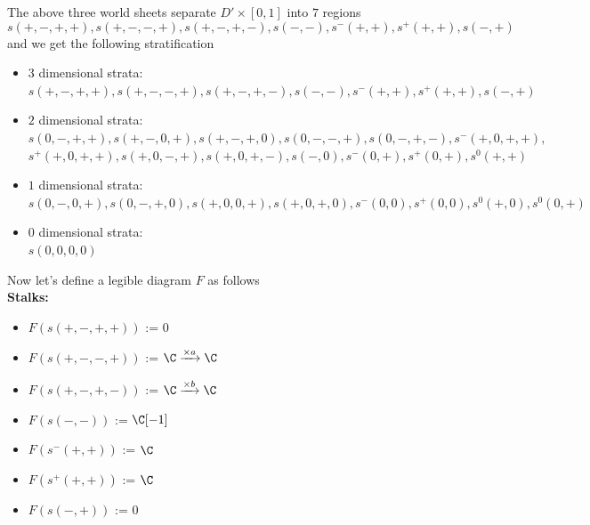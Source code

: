 The above three world sheets separate $D'\times [0,1]$ into $7$ regions
\[
	s(+,-,+,+),s(+,-,-,+),s(+,-,+,-),s(-,-),s^-(+,+),s^+(+,+),s(-,+)
\]
and we get the following stratification
\begin{itemize}
\item $3$ dimensional strata: \\$s(+,-,+,+),s(+,-,-,+),s(+,-,+,-),s(-,-),s^-(+,+),s^+(+,+),s(-,+)$

\item $2$ dimensional strata: \\$s(0,-,+,+),s(+,-,0,+),s(+,-,+,0),s(0,-,-,+),s(0,-,+,-),s^-(+,0,+,+),$\\
$s^+(+,0,+,+),s(+,0,-,+),s(+,0,+,-),s(-,0),s^-(0,+),s^+(0,+),s^0(+,+)$

\item $1$ dimensional strata: \\$s(0,-,0,+),s(0,-,+,0),s(+,0,0,+),s(+,0,+,0),s^-(0,0),s^+(0,0),s^0(+,0),s^0(0,+)$

\item $0$ dimensional strata: \\ $s(0,0,0,0)$
\end{itemize}
Now let's define a legible diagram $F$ as follows\\
\textbf{Stalks:}
\begin{itemize}
\item $F(s(+,-,+,+))$ := $0$
\item $F(s(+,-,-,+))$ := $\C \xrightarrow{\times a} \C $
\item $F(s(+,-,+,-))$ := $\C \xrightarrow{\times b} \C $
\item $F(s(-,-))$ := $\C[-1]$
\item $F(s^-(+,+))$ := $\C$
\item $F(s^+(+,+))$ := $\C$
\item $F(s(-,+))$ := $0$
\end{itemize}

